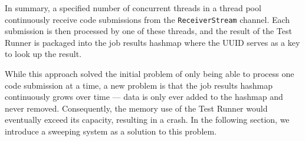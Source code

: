 In summary, a specified number of concurrent threads in a thread pool continuously receive code submissions from the \texttt{ReceiverStream} channel.
Each submission is then processed by one of these threads, and the result of the Test Runner is packaged into the job results hashmap where the UUID serves as a key to look up the result.

While this approach solved the initial problem of only being able to process one code submission at a time, a new problem is that the job results hashmap continuously grows over time --- data is only ever added to the hashmap and never removed.
Consequently, the memory use of the Test Runner would eventually exceed its capacity, resulting in a crash.
In the following section, we introduce a sweeping system as a solution to this problem.